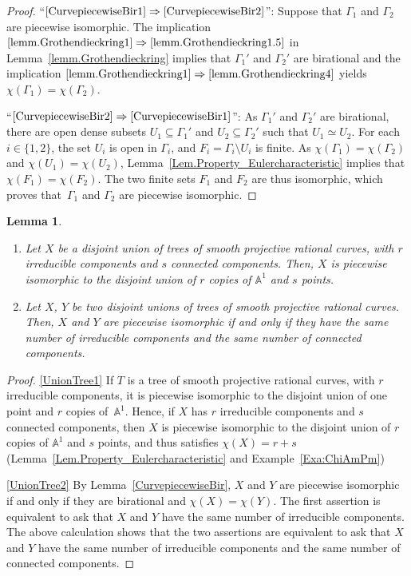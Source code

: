 \documentclass[JEP,XML,SOM,Unicode,NoFloatCountersInSection,published]{cedram}
\newtheorem{lemma}{Lemma}[section]
\theoremstyle{definition}
\newcommand\A{{\mathbb A}}\let\AA\A
\begin{document}
\begin{proof}
``$\eqref{CurvepiecewiseBir1}\Rightarrow\eqref{CurvepiecewiseBir2}$'': Suppose that $\Gamma_1$ and $\Gamma_2$ are piecewise isomorphic. The implication $\eqref{lemm.Grothendieckring1}\Rightarrow \eqref{lemm.Grothendieckring1.5}$
in Lemma~\ref{lemm.Grothendieckring} implies that $\Gamma_1'$ and $\Gamma_2'$ are birational and the implication $\eqref{lemm.Grothendieckring1}\Rightarrow\nobreak \eqref{lemm.Grothendieckring4}$ yields $\chi(\Gamma_1)=\chi(\Gamma_2)$.

``$\eqref{CurvepiecewiseBir2}\Rightarrow\eqref{CurvepiecewiseBir1}$'': As $\Gamma_1'$ and $\Gamma_2'$ are birational, there are open dense subsets $U_1\subseteq \Gamma_1'$ and $U_2\subseteq \Gamma_2'$ such that $U_1\simeq U_2$. For each $i\in \{1,2\}$, the set $U_i$ is open in $\Gamma_i$, and $F_i=\Gamma_i\setminus U_i$ is finite. As $\chi(\Gamma_1)=\chi(\Gamma_2)$ and $\chi(U_1)=\chi(U_2)$, Lemma~\ref{Lem.Property_Eulercharacteristic} implies that $\chi(F_1)=\chi(F_2)$. The two finite sets $F_1$ and $F_2$ are thus isomorphic, which proves that~$\Gamma_1$ and $\Gamma_2$ are piecewise isomorphic.
\end{proof}

\skpt
\begin{lemma}\label{Lem:UnionTree}
\begin{enumerate}
\item\label{UnionTree1}
Let $X$ be a disjoint union of trees of smooth projective rational curves, with $r$ irreducible components and $s$ connected components. Then, $X$ is piecewise isomorphic to the disjoint union of $r$ copies of $\A^1$ and $s$ points.
\item\label{UnionTree2}
Let $X$, $Y$ be two disjoint unions of trees of smooth projective rational curves. Then, $X$ and $Y$ are piecewise isomorphic if and only if they have the same number of irreducible components and the same number of connected components.
\end{enumerate}
\end{lemma}

\skpt
\begin{proof}
\eqref{UnionTree1}
If $T$ is a tree of smooth projective rational curves, with $r$ irreducible components, it is piecewise isomorphic to the disjoint union of one point and $r$ copies of~$\A^1$. Hence, if $X$ has $r$ irreducible components and $s$ connected components, then $X$ is piecewise isomorphic to the disjoint union of $r$ copies of $\A^1$ and $s$ points, and thus satisfies $\chi(X)=r+s$ (Lemma~\ref{Lem.Property_Eulercharacteristic} and Example~\ref{Exa:ChiAmPm})

\eqref{UnionTree2}
By Lemma~\ref{CurvepiecewiseBir}, $X$ and $Y$ are piecewise isomorphic if and only if they are birational and $\chi(X)=\chi(Y)$. The first assertion is equivalent to ask that $X$ and $Y$ have the same number of irreducible components. The above calculation shows that the two assertions are equivalent to ask that $X$ and $Y$ have the same number of irreducible components and the same number of connected components.
\end{proof}
\end{document}
